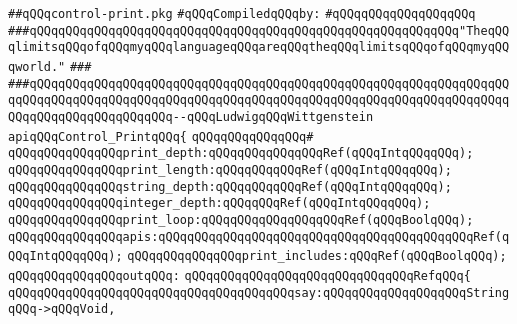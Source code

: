 \label{src/lib/compiler/front/basics/print/control-print.pkg}
\verb|##qQQqcontrol-print.pkg|\newline
\newline
\verb|#qQQqCompiledqQQqby:|\newline
\verb|#qQQqqQQqqQQqqQQqqQQq|\newline
\newline
\newline
\newline
\verb|###qQQqqQQqqQQqqQQqqQQqqQQqqQQqqQQqqQQqqQQqqQQqqQQqqQQqqQQqqQQq"TheqQQqlimitsqQQqofqQQqmyqQQqlanguageqQQqareqQQqtheqQQqlimitsqQQqofqQQqmyqQQqworld."|\newline
\verb|###|\newline
\verb|###qQQqqQQqqQQqqQQqqQQqqQQqqQQqqQQqqQQqqQQqqQQqqQQqqQQqqQQqqQQqqQQqqQQqqQQqqQQqqQQqqQQqqQQqqQQqqQQqqQQqqQQqqQQqqQQqqQQqqQQqqQQqqQQqqQQqqQQqqQQqqQQqqQQqqQQqqQQqqQQq--qQQqLudwigqQQqWittgenstein|\newline
\newline
\newline
\newline
\verb|apiqQQqControl_PrintqQQq{|\newline
\verb|qQQqqQQqqQQqqQQq#|\newline
\verb|qQQqqQQqqQQqqQQqprint_depth:qQQqqQQqqQQqqQQqRef(qQQqIntqQQqqQQq);|\newline
\verb|qQQqqQQqqQQqqQQqprint_length:qQQqqQQqqQQqRef(qQQqIntqQQqqQQq);|\newline
\verb|qQQqqQQqqQQqqQQqstring_depth:qQQqqQQqqQQqRef(qQQqIntqQQqqQQq);|\newline
\verb|qQQqqQQqqQQqqQQqinteger_depth:qQQqqQQqRef(qQQqIntqQQqqQQq);|\newline
\newline
\verb|qQQqqQQqqQQqqQQqprint_loop:qQQqqQQqqQQqqQQqqQQqRef(qQQqBoolqQQq);|\newline
\newline
\verb|qQQqqQQqqQQqqQQqapis:qQQqqQQqqQQqqQQqqQQqqQQqqQQqqQQqqQQqqQQqqQQqRef(qQQqIntqQQqqQQq);|\newline
\verb|qQQqqQQqqQQqqQQqprint_includes:qQQqRef(qQQqBoolqQQq);|\newline
\newline
\verb|qQQqqQQqqQQqqQQqoutqQQq:|\newline
\verb|qQQqqQQqqQQqqQQqqQQqqQQqqQQqqQQqRefqQQq{|\newline
\verb|qQQqqQQqqQQqqQQqqQQqqQQqqQQqqQQqqQQqqQQqsay:qQQqqQQqqQQqqQQqqQQqStringqQQq->qQQqVoid,|\newline
